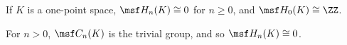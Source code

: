 \begin{problem}[16.7]
  If $K$ is a one-point space, $\msf H_n(K) \cong 0$ for $n \geq 0$, and $\msf
  H_0(K) \cong \ZZ$.
\end{problem}
\begin{solution}
  For $n > 0$, $\msf C_n(K)$ is the trivial group, and so $\msf H_n(K) \cong 0$.
\end{solution}
